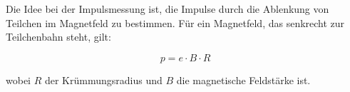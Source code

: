 Die Idee bei der Impulsmessung ist, die Impulse durch die Ablenkung von Teilchen im Magnetfeld zu
bestimmen. Für ein Magnetfeld, das senkrecht zur Teilchenbahn steht, gilt:

\[ p=e\cdot B \cdot R \]

wobei $R$ der Krümmungsradius und $B$ die magnetische Feldstärke ist. 
